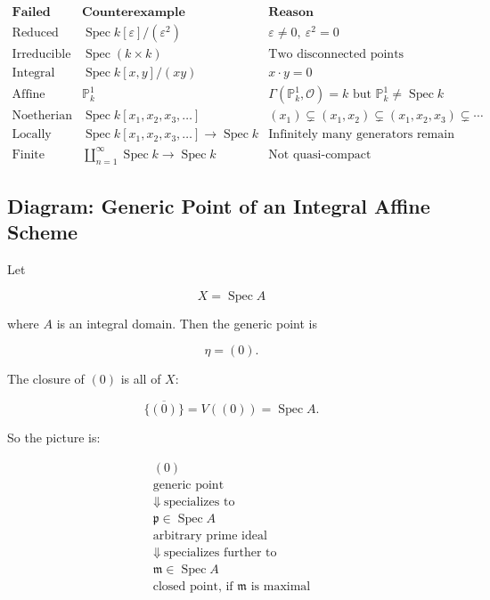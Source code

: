 \documentclass[12pt,a4paper]{article}
\theoremstyle{notespace}
\begin{document}
\[
\begin{array}{c|c|c}
	\textbf{Failed property}
	& \textbf{Counterexample}
	& \textbf{Reason}
	\\
	\hline
	\text{Reduced}
	&
	\operatorname{Spec}k[\varepsilon]/(\varepsilon^2)
	&
	\varepsilon\neq 0,\ \varepsilon^2=0
	\\
	\hline
	\text{Irreducible}
	&
	\operatorname{Spec}(k\times k)
	&
	\text{Two disconnected points}
	\\
	\hline
	\text{Integral}
	&
	\operatorname{Spec}k[x,y]/(xy)
	&
	x\cdot y=0
	\\
	\hline
	\text{Affine}
	&
	\mathbb{P}^1_k
	&
	\Gamma(\mathbb{P}^1_k,\mathcal{O})=k
	\text{ but } \mathbb{P}^1_k\neq \operatorname{Spec}k
	\\
	\hline
	\text{Noetherian}
	&
	\operatorname{Spec}k[x_1,x_2,x_3,\dots]
	&
	(x_1)\subsetneq (x_1,x_2)\subsetneq (x_1,x_2,x_3)\subsetneq\cdots
	\\
	\hline
	\text{Locally finite type}
	&
	\operatorname{Spec}k[x_1,x_2,x_3,\dots]\to\operatorname{Spec}k
	&
	\text{Infinitely many generators remain locally}
	\\
	\hline
	\text{Finite type}
	&
	\coprod_{n=1}^{\infty}\operatorname{Spec}k\to\operatorname{Spec}k
	&
	\text{Not quasi-compact}
\end{array}
\]

\subsection{Diagram: Generic Point of an Integral Affine Scheme}

Let

\[
X=\operatorname{Spec}A
\]

where \(A\) is an integral domain. Then the generic point is

\[
\eta=(0).
\]

The closure of \((0)\) is all of \(X\):

\[
\overline{\{(0)\}}
=
V((0))
=
\operatorname{Spec}A.
\]

So the picture is:

\[
\begin{array}{c}
	\boxed{
		(0)
	}
	\\[0.5em]
	\text{generic point}
	\\[1em]
	\Downarrow\ \text{specializes to}
	\\[1em]
	\boxed{
		\mathfrak{p}\in \operatorname{Spec}A
	}
	\\[0.5em]
	\text{arbitrary prime ideal}
	\\[1em]
	\Downarrow\ \text{specializes further to}
	\\[1em]
	\boxed{
		\mathfrak{m}\in \operatorname{Spec}A
	}
	\\[0.5em]
	\text{closed point, if } \mathfrak{m} \text{ is maximal}
\end{array}
\]
\end{document}
